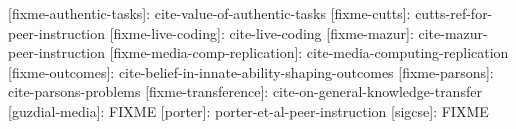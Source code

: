 \documentclass{article}
\begin{document}
[fixme-authentic-tasks]: cite-value-of-authentic-tasks
[fixme-cutts]: cutts-ref-for-peer-instruction
[fixme-live-coding]: cite-live-coding
[fixme-mazur]: cite-mazur-peer-instruction
[fixme-media-comp-replication]: cite-media-computing-replication
[fixme-outcomes]: cite-belief-in-innate-ability-shaping-outcomes
[fixme-parsons]: cite-parsons-problems
[fixme-transference]: cite-on-general-knowledge-transfer
[guzdial-media]: FIXME
[porter]: porter-et-al-peer-instruction
[sigcse]: FIXME



\end{document}
